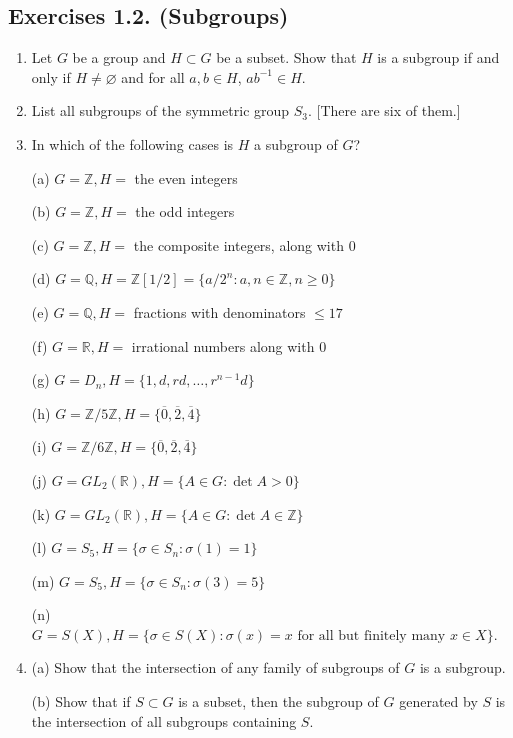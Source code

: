 \documentclass[leqno]{book}
\begin{document}
\subsection*{Exercises 1.2. (Subgroups)}
\begin{enumerate}
\item Let $G$ be a group and $H\subset G$ be a subset.  Show that $H$ is a subgroup if and only if $H\ne\varnothing$ and for all $a,b\in H$, $ab^{-1}\in H$.

\item List all subgroups of the symmetric group $S_3$.  [There are six of them.]

\item In which of the following cases is $H$ a subgroup of $G$?

(a) $G=\mathbb Z,H=$ the even integers

(b) $G=\mathbb Z,H=$ the odd integers

(c) $G=\mathbb Z,H=$ the composite integers, along with $0$

(d) $G=\mathbb Q,H=\mathbb Z[1/2]=\{a/2^n:a,n\in\mathbb Z,n\geqslant 0\}$

(e) $G=\mathbb Q,H=$ fractions with denominators $\leqslant 17$

(f) $G=\mathbb R,H=$ irrational numbers along with $0$ %

(g) $G=D_n,H=\{1,d,rd,\dots,r^{n-1}d\}$

(h) $G=\mathbb Z/5\mathbb Z,H=\{\overline 0,\overline 2,\overline 4\}$

(i) $G=\mathbb Z/6\mathbb Z,H=\{\overline 0,\overline 2,\overline 4\}$

(j) $G=GL_2(\mathbb R),H=\{A\in G:\det A>0\}$

(k) $G=GL_2(\mathbb R),H=\{A\in G:\det A\in\mathbb Z\}$

(l) $G=S_5,H=\{\sigma\in S_n:\sigma(1)=1\}$

(m) $G=S_5,H=\{\sigma\in S_n:\sigma(3)=5\}$

(n) $G=S(X),H=\{\sigma\in S(X):\sigma(x)=x\text{ for all but finitely many }x\in X\}$.

\item (a) Show that the intersection of any family of subgroups of $G$ is a subgroup.

(b) Show that if $S\subset G$ is a subset, then the subgroup of $G$ generated by $S$ is the intersection of all subgroups containing $S$.


\end{enumerate}
\end{document}
